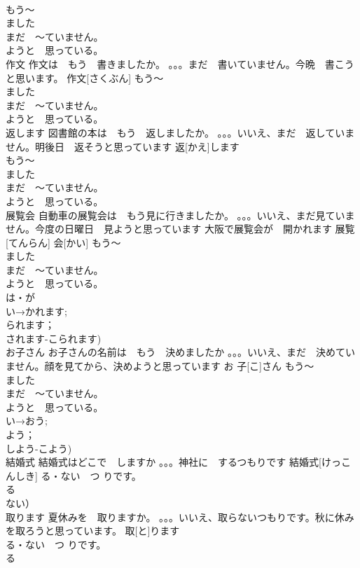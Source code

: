 \documentclass[8pt]{extreport}
\begin{document}
\begin{CJK}{UTF8}{min}
\\	もう～
\\	ました　
\\	まだ　～ていません。
\\	ようと　思っている。
\\	作文	作文は　もう　書きましたか。 。。。まだ　書いていません。今晩　書こうと思います。	作文[さくぶん]				もう～
\\	ました　
\\	まだ　～ていません。
\\	ようと　思っている。
\\	返します	図書館の本は　もう　返しましたか。 。。。いいえ、まだ　返していません。明後日　返そうと思っています	返[かえ]します			
\\	もう～
\\	ました　
\\	まだ　～ていません。
\\	ようと　思っている。
\\	展覧会	自動車の展覧会は　もう見に行きましたか。 。。。いいえ、まだ見ていません。今度の日曜日　見ようと思っています 大阪で展覧会が　開かれます	展覧[てんらん] 会[かい]				もう～
\\	ました　
\\	まだ　～ていません。
\\	ようと　思っている。
\\	は・が
\\	い→かれます;
\\	られます；
\\	されます-こられます)
\\	お子さん	お子さんの名前は　もう　決めましたか 。。。いいえ、まだ　決めていません。顔を見てから、決めようと思っています	お 子[こ]さん				もう～
\\	ました　
\\	まだ　～ていません。
\\	ようと　思っている。
\\	い→おう;
\\	よう；
\\	しよう-こよう)
\\	結婚式	結婚式はどこで　しますか 。。。神社に　するつもりです	結婚式[けっこんしき]				る・ない　つ りです。
\\	る
\\	ない）
\\	取ります	夏休みを　取りますか。 。。。いいえ、取らないつもりです。秋に休みを取ろうと思っています。	取[と]ります			
\\	る・ない　つ りです。
\\	る

\end{CJK}
\end{document}
